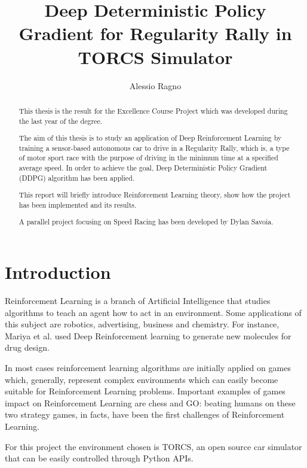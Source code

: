 \documentclass[Lau,oneside,noexaminfo]{sapthesis} %
\title{Deep Deterministic Policy Gradient for Regularity Rally in TORCS Simulator}
\author{Alessio Ragno}
\begin{document}
\frontmatter
\maketitle
\dedication{Dedicated to\\the ones that supported me in my experience}
\begin{abstract}
This thesis is the result for the Excellence Course Project which was developed during the last year of the degree.

The aim of this thesis is to study an application of Deep Reinforcement Learning by training a sensor-based autonomous car to drive in a Regularity Rally, which is, a type of motor sport race with the purpose of driving in the minimum time at a specified average speed. In order to achieve the goal, Deep Deterministic Policy Gradient (DDPG) algorithm has been applied.

This report will briefly introduce Reinforcement Learning theory, show how the project has been implemented and its results.

A parallel project focusing on Speed Racing has been developed by Dylan Savoia.

\end{abstract}
\begin{spacing}{0}
\tableofcontents
\end{spacing}
\mainmatter
\chapter{Introduction}
Reinforcement Learning is a branch of Artificial Intelligence that studies algorithms to teach an agent how to act in an environment. Some applications of this subject are robotics, advertising, business and chemistry. For instance, Mariya et al. used Deep Reinforcement learning to generate new molecules for drug design. \cite{TROPSHA}

In most cases reinforcement learning algorithms are initially applied on games which, generally, represent complex environments which can easily become suitable for Reinforcement Learning problems. Important examples of games impact on Reinforcement Learning are chess and GO: beating humans on these two strategy games, in facts, have been the first challenges of Reinforcement Learning. 

For this project the environment chosen is TORCS, an open source car simulator that can be easily controlled through Python APIs.
\end{document}
